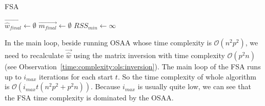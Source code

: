 \begin{algorithm}[H]
    \label{alg:feasible_solution}
        
    \caption{FSA}
    $\vec{\hat{w}_{final}} \gets \emptyset$\;
    $\vec{m_{final}} \gets \emptyset$\;
    $RSS_{min} \gets \infty$\;

    \;
\end{algorithm}



\begin{observation}  \label{time:complexity:fsa}
In the main loop, beside running OSAA whose time complexity is $\mathcal{O}(n^2p^2)$, we need to recalculate $\vec{\hat{w}}$ using the matrix inversion with time complexity $\mathcal{O}(p^2n)$ (see Observation~\ref{time:complexity:ols:inversion}).
The main loop of the FSA runs up to $i_{max}$ iterations for each start $t$. So the time complexity of whole algorithm is  $\mathcal{O}( i_{max}t(n^2p^2 + p^2n)  )$. Because $i_{max}$ is usually quite low, we can see that the FSA time complexity is dominated by the OSAA. 
\end{observation} 

